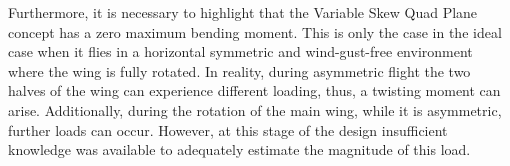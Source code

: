 Furthermore, it is necessary to highlight that the Variable Skew Quad Plane concept has a zero maximum bending moment.
This is only the case in the ideal case when it flies in a horizontal symmetric and wind-gust-free environment where the wing is fully rotated.
In reality, during asymmetric flight the two halves of the wing can experience different loading, thus, a twisting moment can arise.
Additionally, during the rotation of the main wing, while it is asymmetric, further loads can occur.
However, at this stage of the design insufficient knowledge was available to adequately estimate the magnitude of this load.

